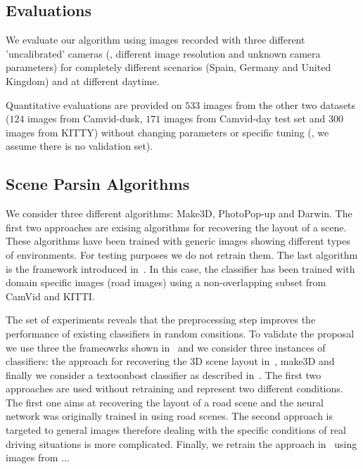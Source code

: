 \subsection{Evaluations}
We evaluate our algorithm using images recorded
with three different 'uncalibrated' cameras (\ie, different image
resolution and unknown camera parameters) for completely different
scenarios (Spain, Germany and United Kingdom) and at different
daytime. 


Quantitative evaluations are provided on $533$ images from the
other two datasets ($124$ images from Camvid-dusk, $171$
images from Camvid-day test set and $300$ images from KITTY)
without changing parameters or specific tuning (\ie, we assume
there is no validation set).

\subsection{Scene Parsin Algorithms}
We consider three different algorithms: Make3D, PhotoPop-up and Darwin. The first two approaches are exising algorithms for recovering the layout of a scene. These algorithms have been trained with generic images showing different types of environments. For testing purposes we do not retrain them. The last algorithm is the framework introduced in~\cite{}. In this case, the classifier has been trained with domain specific images (road images) using a non-overlapping subset from CamVid and KITTI.

The set of experiments reveals that the preprocessing step improves the performance of existing classifiers in random consitions. To validate the proposal we use three the frameowrks shown in~\fig{} and we consider three instances of classifiers: the approach for recovering the 3D scene layout in~\cite{}, make3D and finally we consider a textoonbost classifier as described in~\cite{}. The first two approaches are used without retraining and represent two different conditions. The first one aims at recovering the layout of a road scene and the neural network was originally trained in using road scenes. The second approach is targeted to general images therefore dealing with the specific conditions of real driving situations is more complicated. Finally, we retrain the approach in~\cite{} using images from ... 


